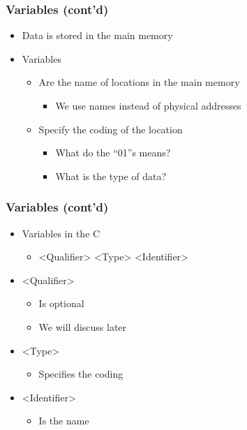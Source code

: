 \documentclass{../c-lecture}
\begin{document}
\begin{frame}
  \frametitle{Variables (cont'd)}
  \begin{itemize}
    \item Data is stored in the main memory
    \item Variables
    \begin{itemize}
      \item Are the {\color{Orange} name} of locations in the main
        memory
      \begin{itemize}
        \item We use names instead of physical addresses
      \end{itemize}
      \item Specify the {\color{Green} coding} of the location
      \begin{itemize}
        \item What do the ``01''s means?
        \item What is the {\color{Cyan} type} of data?
      \end{itemize}
    \end{itemize}
  \end{itemize}
\end{frame}

\begin{frame}
  \frametitle{Variables (cont’d)}
  \begin{itemize}
    \item Variables in the C
    \begin{itemize}
      \item <Qualifier> <Type> <Identifier>
    \end{itemize}
    \item {\color{Orange} <Qualifier>}
    \begin{itemize}
      \item Is optional
      \item We will discuss later
    \end{itemize}
    \item {\color{Green}<Type>}
    \begin{itemize}
      \item Specifies the coding
    \end{itemize}
    \item {\color{Cyan}<Identifier>}
    \begin{itemize}
      \item Is the name
    \end{itemize}
  \end{itemize}
\end{frame}
\end{document}
